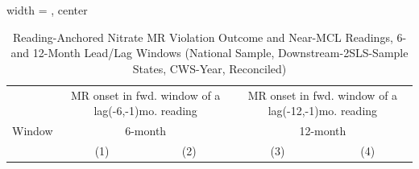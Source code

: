 
\begin{table}[htbp]
   
   \caption{\label{tab:mr_concentration_lag_national_downstream_states_yearly_reconciled} Reading-Anchored Nitrate MR Violation Outcome and Near-MCL Readings, 6- and 12-Month Lead/Lag Windows (National Sample, Downstream-2SLS-Sample States, CWS-Year, Reconciled)}
   \bigskip
   
   \centering
   
   \begin{adjustbox}{width = \textwidth, center}
      
      
      \begin{tabular}{lcccc}
         \toprule
         
          & \multicolumn{2}{c}{MR onset in fwd. window of a lag(-6,-1)mo. reading} & \multicolumn{2}{c}{MR onset in fwd. window of a lag(-12,-1)mo. reading}\\
         
         Window & \multicolumn{2}{c}{6-month} & \multicolumn{2}{c}{12-month} \\ 
         
                                                      & (1)             & (2)             & (3)             & (4)\\  
         

\end{tabular}
\end{adjustbox}
\end{table}
